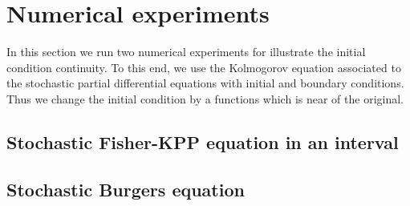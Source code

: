 \documentclass[review, onefignum, onetabnum]{siamart171218}
\begin{document}
\section{Numerical experiments}
        In this section we run two numerical experiments for illustrate
    the initial condition continuity. To this end, we use the Kolmogorov
    equation associated to the
    stochastic partial differential equations with initial and boundary
    conditions. Thus we change the initial condition  by a functions which
    is near of the original.
%
    \subsection*{Stochastic Fisher-KPP equation in an interval}
        
    \subsection*{Stochastic Burgers equation}
        
    
    
\end{document}
